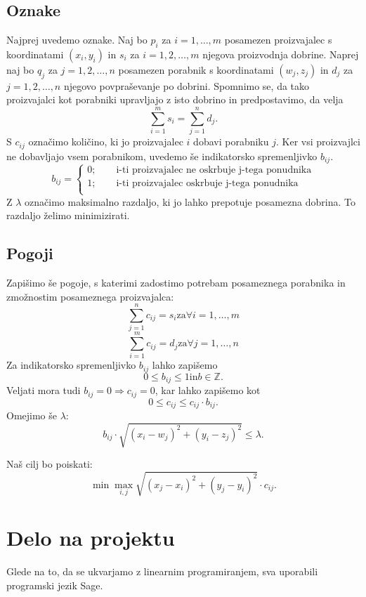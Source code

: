 \documentclass[a4paper, 11pt]{article}
\newcommand{\Z}{\mathbb Z}
\begin{document}
\subsection{Oznake}
Najprej uvedemo oznake. Naj bo $p_i$ za $i=1,\dots,m$ posamezen proizvajalec s koordinatami $(x_i,y_i)$ in $s_i$ za $i=1,2,\dots,m$ njegova proizvodnja dobrine. 
Naprej naj bo $q_j$ za $j=1,2,\dots,n$ posamezen porabnik s koordinatami $(w_j,z_j)$ in $d_j$ za $j=1,2,\dots,n$ njegovo povpraševanje 
po dobrini. Spomnimo se, da tako proizvajalci kot porabniki upravljajo z isto dobrino in predpostavimo, da velja
$$
\sum_{i=1}^m s_i = \sum_{j=1}^n d_j.
$$ 
S $c_{ij}$ označimo količino, ki jo proizvajalec $i$ dobavi porabniku $j$. Ker vsi proizvajlci ne 
dobavljajo vsem porabnikom, uvedemo še indikatorsko spremenljivko $b_{ij}$.
$$
b_{ij} = 
\begin{cases}
    0;\qquad \textrm{i-ti proizvajalec ne oskrbuje j-tega ponudnika} \\
    1;\qquad \textrm{i-ti proizvajalec oskrbuje j-tega ponudnika} \\
\end{cases} 
$$
Z $\lambda$ označimo maksimalno razdaljo, ki jo lahko prepotuje posamezna dobrina. To razdaljo 
želimo minimizirati.
\subsection{Pogoji}
Zapišimo še pogoje, s katerimi zadostimo potrebam posameznega porabnika in zmožnostim posameznega 
proizvajalca:
$$
\sum_{j=1}^n c_{ij} = s_i \text{za} \forall i = 1,\dots,m 
$$
$$
\sum_{i=1}^m c_{ij} = d_j \text{za} \forall j = 1,\dots,n 
$$
Za indikatorsko spremenljivko $b_{ij}$ lahko zapišemo $$0 \leq b_{ij} \leq 1 \text{in} b \in \Z.$$
Veljati mora tudi $b_{ij}=0 \Rightarrow c_{ij}=0$, kar lahko zapišemo kot 
$$0 \leq c_{ij} \leq c_{ij}\cdot b_{ij}.$$
Omejimo še $\lambda$:
$$b_{ij}\cdot \sqrt{(x_i - w_j)^2+(y_i - z_j)^2} \leq \lambda.$$

Naš cilj bo poiskati:
$$
\min \max_{i,j} \sqrt{(x_j-x_i)^2 + (y_j-y_i)^2} \cdot c_{ij}.
$$

\section{Delo na projektu}
Glede na to, da se ukvarjamo z linearnim programiranjem, sva uporabili programski jezik Sage.
\end{document}
